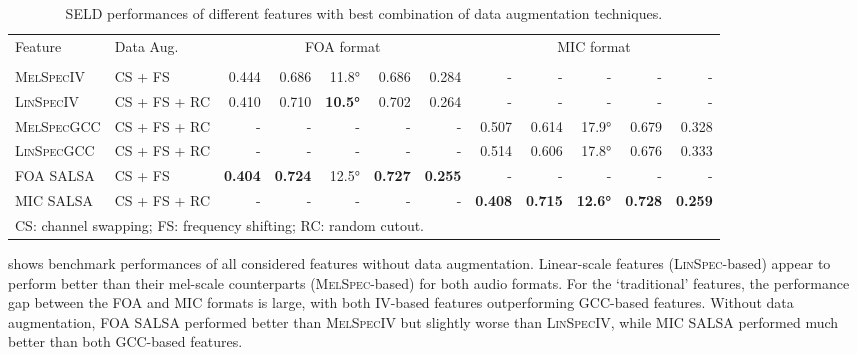 \documentclass[journal]{IEEEtran}
\begin{document}
\begin{table*}[t]
    \centering
    \caption{SELD performances of different features with best combination of data augmentation techniques.}
    \noindent\begin{tabularx}{\textwidth}{Xl rrrrr rrrrr }
    \toprule 
        \multirow{2}[2]{*}{Feature} & 
        \multirow{2}[2]{*}{Data Aug.} &  
        \multicolumn{5}{c}{FOA format} &
        \multicolumn{5}{c}{MIC format}
    \\ \cmidrule(lr){3-7}\cmidrule(lr){8-12}
        & & 
          &
          &
         &
          &
          &
          &
          &
         &
          &
         
        \\ \midrule
        \textsc{MelSpecIV}   & CS + FS 
                    & 0.444 & 0.686 & 11.8\si{\degree} & 0.686 & 0.284 
                    & - & - & - & - & - \\
        \textsc{LinSpecIV}   & CS + FS + RC
                    & 0.410 & 0.710 & \bf{10.5\si{\degree}} & 0.702 & 0.264
                    & - & - & - & - & - \\
        \textsc{MelSpecGCC}  & CS + FS + RC
                    & - & - & - & - & - 
                    & 0.507 & 0.614 & 17.9\si{\degree} & 0.679 & 0.328 \\ 
        \textsc{LinSpecGCC}  & CS + FS + RC
                    & - & - & - & - & - 
                    & 0.514 & 0.606 & 17.8\si{\degree} & 0.676 & 0.333 \\
        \midrule                    
        FOA SALSA   & CS + FS
                    & \bf{0.404} & \bf{0.724} & 12.5\si{\degree} & \bf{0.727} & \bf{0.255} 
                    & - & - & - & - & - \\
        MIC SALSA   & CS + FS + RC
                    & - & - & - & - & - 
                    & \bf{0.408} & \bf{0.715} & \bf{12.6\si{\degree}} & \bf{0.728} & \bf{0.259} \\
    \bottomrule
    \multicolumn{8}{l}{CS: channel swapping; FS: frequency shifting; RC: random cutout.}
    \end{tabularx}
    \label{tab:bestaug}
\end{table*}

 shows benchmark performances of all considered features without data augmentation. Linear-scale features (\textsc{LinSpec}-based) appear to perform better than their mel-scale counterparts (\textsc{MelSpec}-based) for both audio formats. 
For the `traditional' features, the performance gap between the FOA and MIC formats is large, with both IV-based features outperforming GCC-based features. Without data augmentation, FOA SALSA performed better than \textsc{MelSpecIV} but slightly worse than \textsc{LinSpecIV}, while MIC SALSA performed much better than both GCC-based features. 
\end{document}
